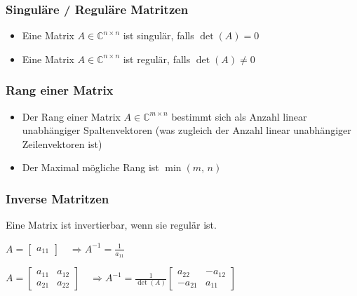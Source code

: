\subsubsection{Singuläre / Reguläre Matritzen}

\begin{itemize}
    \item Eine Matrix $A \in \mathbb{C}^{n \times n}$ ist singulär, falls $\det(A) = 0$
    \item Eine Matrix $A \in \mathbb{C}^{n \times n}$ ist regulär, falls $\det(A) \neq 0$
\end{itemize}


\subsubsection{Rang einer Matrix}

\begin{itemize}
    \item Der Rang einer Matrix $A \in \mathbb{C}^{m \times n}$ bestimmt sich als Anzahl linear unabhängiger Spaltenvektoren
        (was zugleich der Anzahl linear unabhängiger Zeilenvektoren ist)
    \item Der Maximal mögliche Rang ist $\min(m, \,n)$
\end{itemize}



\subsubsection{Inverse Matritzen}

Eine Matrix ist invertierbar, wenn sie regulär ist.

\smallskip

\begin{minipage}[c]{0.38\columnwidth}
    $A = \begin{bmatrix} 
            a_{11} 
        \end{bmatrix} 
        \quad \Rightarrow A^{-1} = \frac{1}{a_{11}}$
\end{minipage}
\hfill
\begin{minipage}[c]{0.6\columnwidth}
    $A = \begin{bmatrix}
            a_{11}  & a_{12}    \\
            a_{21}  & a_{22}
        \end{bmatrix}
        \quad \Rightarrow A^{-1} = \frac{1}{\det(A)} \begin{bmatrix}
                                        a_{22}      & - a_{12}    \\
                                        - a_{21}    & a_{11}
                                        \end{bmatrix}$
\end{minipage}

